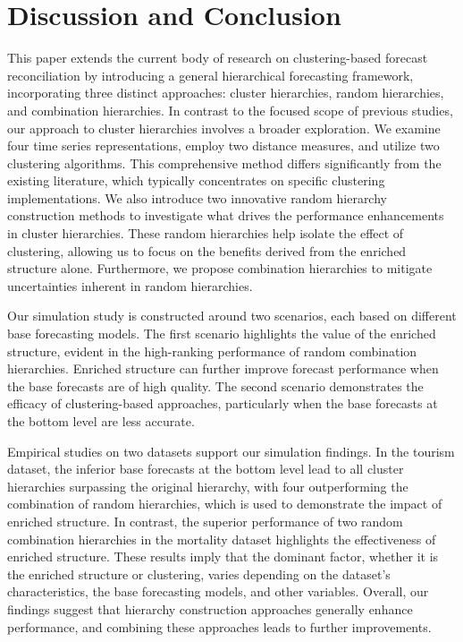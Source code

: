 \documentclass[a4paper,review,12pt,authoryear]{elsarticle}
\begin{document}
\section{Discussion and Conclusion}
\label{sec:conclusion}

This paper extends the current body of research on clustering-based forecast reconciliation by introducing a general hierarchical forecasting framework, incorporating three distinct approaches: cluster hierarchies, random hierarchies, and combination hierarchies.
In contrast to the focused scope of previous studies, our approach to cluster hierarchies involves a broader exploration. We examine four time series representations, employ two distance measures, and utilize two clustering algorithms. This comprehensive method differs significantly from the existing literature, which typically concentrates on specific clustering implementations.
We also introduce two innovative random hierarchy construction methods to investigate what drives the performance enhancements in cluster hierarchies. These random hierarchies help isolate the effect of clustering, allowing us to focus on the benefits derived from the enriched structure alone.
Furthermore, we propose combination hierarchies to mitigate uncertainties inherent in random hierarchies.

Our simulation study is constructed around two scenarios, each based on different base forecasting models. The first scenario highlights the value of the enriched structure, evident in the high-ranking performance of random combination hierarchies. Enriched structure can further improve forecast performance when the base forecasts are of high quality. The second scenario demonstrates the efficacy of clustering-based approaches, particularly when the base forecasts at the bottom level are less accurate.

Empirical studies on two datasets support our simulation findings. In the tourism dataset, the inferior base forecasts at the bottom level lead to all cluster hierarchies surpassing the original hierarchy, with four outperforming the combination of random hierarchies, which is used to demonstrate the impact of enriched structure. In contrast, the superior performance of two random combination hierarchies in the mortality dataset highlights the effectiveness of enriched structure. These results imply that the dominant factor, whether it is the enriched structure or clustering, varies depending on the dataset's characteristics, the base forecasting models, and other variables. Overall, our findings suggest that hierarchy construction approaches generally enhance performance, and combining these approaches leads to further improvements.
\end{document}
